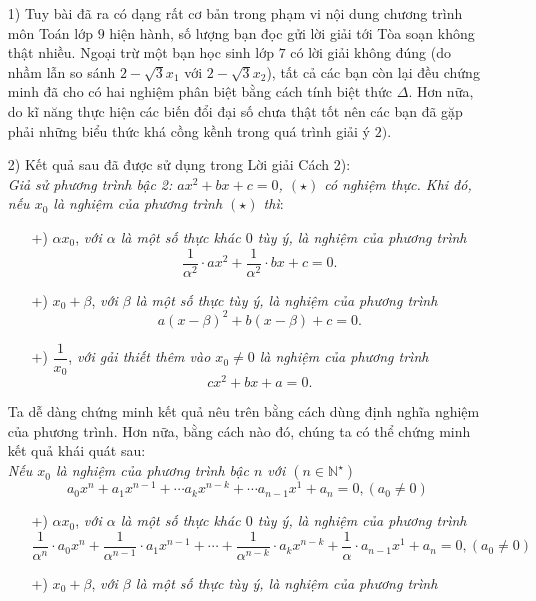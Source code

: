 \begin{bt}
{\begin{itemize}
		\end{itemize} 
		\begin{nx}\hfill
			\begin{itemize}
				\item[1)] Tuy bài đã ra có dạng rất cơ bản trong phạm vi nội dung chương trình môn Toán lớp $9$ hiện hành, số lượng bạn đọc gửi lời giải tới Tòa soạn không thật nhiều. Ngoại trừ một bạn học sinh lớp $7$ có lời giải không đúng (do nhầm lẫn so sánh $2-\sqrt{3}x_1$ với $2-\sqrt{3}x_2$), tất cả các bạn còn lại đều chứng minh đã cho có hai nghiệm phân biệt bằng cách tính biệt thức $\Delta$. Hơn nữa, do kĩ năng thực hiện các biến đổi đại số chưa thật tốt nên các bạn đã gặp phải những biểu thức khá cồng kềnh trong quá trình giải ý $2)$.
				\item[2)] Kết quả sau đã được sử dụng trong Lời giải Cách 2): \\
				\textit{Giả sử phương trình bậc 2:	$ax^2+bx+c=0$, $(\star)$ có nghiệm thực. Khi đó, nếu $x_0$ là nghiệm của phương trình $(\star)$ thì}:
				\begin{itemize}
					\item[+)] $\alpha x_0$, \textit{với $\alpha$ là một số thực khác $0$ tùy ý, là nghiệm của phương trình}
					\[\dfrac{1}{\alpha^2}\cdot ax^2+\dfrac{1}{\alpha^2}\cdot bx+c=0.\]
					\item[+)] $x_0+\beta$, \textit{với $\beta$ là một số thực tùy ý, là nghiệm của phương trình}
					\[a(x-\beta)^2+b(x-\beta)+c=0.\]
					\item[+)] $\dfrac{1}{x_0}$, \textit{với gải thiết thêm vào $x_0\ne 0$ là nghiệm của phương trình}
					\[cx^2+bx+a=0.\]
				\end{itemize}
				Ta dễ dàng chứng minh kết quả nêu trên bằng cách dùng định nghĩa nghiệm của phương trình. Hơn nữa, bằng cách nào đó, chúng ta có thể chứng minh kết quả khái quát sau:\\
				\textit{Nếu $x_0$ là nghiệm của phương trình bậc $n$ với $(n\in \mathbb{N}^{\star})$}	
				\[a_0 x^n+a_1 x^{n-1}+\cdots a_k x^{n-k}+\cdots a_{n-1} x^{1}+a_n=0,(a_0\ne 0)\]
				\begin{itemize}
					\item[+)] $\alpha x_0$, \textit{với $\alpha$ là một số thực khác $0$ tùy ý, là nghiệm của phương trình}
					\[\dfrac{1}{\alpha^n}\cdot a_0 x^n+\dfrac{1}{\alpha^{n-1}}\cdot a_1 x^{n-1}+\cdots +\dfrac{1}{\alpha^{n-k}}\cdot a_k x^{n-k}+\dfrac{1}{\alpha}\cdot a_{n-1} x^{1}+a_n=0,(a_0\ne 0)\]
					\item[+)] $x_0+\beta$, \textit{với $\beta$ là một số thực tùy ý, là nghiệm của phương trình}

\end{itemize}
\end{itemize}
\end{nx}}
\end{bt}
